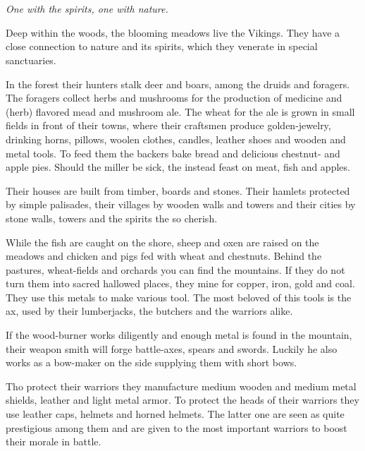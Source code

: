 \section{}\label{ch:Tribes:Vikings}

\begin{flushright}
	\emph{One with the spirits, one with nature.}
\end{flushright}

Deep within the woods, the blooming meadows live the \gls*{Vikings}. They have
a close connection to nature and its spirits, which they venerate in special
sanctuaries.

In the forest their hunters stalk deer and boars, among the druids and
foragers. The foragers collect herbs and mushrooms for the production of
medicine and (herb) flavored mead and mushroom ale. The wheat for the ale is
grown in small fields in front of their towns, where their craftsmen produce
golden-jewelry, drinking horns, pillows, woolen clothes, candles, leather shoes
and wooden and metal tools. To feed them the backers bake bread and delicious
chestnut- and apple pies. Should the miller be sick, the instead feast on meat,
fish and apples.

Their houses are built from timber, boards and stones. Their hamlets protected
by simple palisades, their villages by wooden walls and towers and their cities
by stone walls, towers and the spirits the so cherish.

While the fish are caught on the shore, sheep and oxen are raised on the
meadows and chicken and pigs fed with wheat and chestnuts. Behind the pastures,
wheat-fields and orchards you can find the mountains. If they do not turn them
into sacred hallowed places, they mine for copper, iron, gold and coal. They
use this metals to make various tool. The most beloved of this tools is the ax,
used by their lumberjacks, the butchers and the warriors alike.

If the wood-burner works diligently and enough metal is found in the mountain,
their weapon smith will forge battle-axes, spears and swords. Luckily he also
works as a bow-maker on the side supplying them with short bows.

Tho protect their warriors they manufacture medium wooden and medium metal
shields, leather and light metal armor. To protect the heads of their warriors
they use leather caps, helmets and horned helmets. The latter one are seen as
quite prestigious among them and are given to the most important warriors to
boost their morale in battle.

